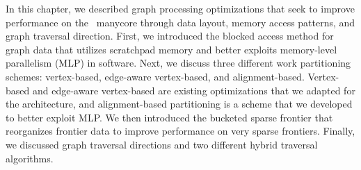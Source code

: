In this chapter, we described graph processing optimizations that seek to improve performance on the \hb~manycore through data layout, memory access patterns, and graph traversal direction.
First, we introduced the blocked access method for graph data that utilizes scratchpad memory and better exploits memory-level parallelism (MLP) in software.
Next, we discuss three different work partitioning schemes: vertex-based, edge-aware vertex-based, and alignment-based.
Vertex-based and edge-aware vertex-based are existing optimizations that we adapted for the \hb architecture, and alignment-based partitioning is a scheme that we developed to better exploit MLP.
We then introduced the bucketed sparse frontier that reorganizes frontier data to improve performance on very sparse frontiers.
Finally, we discussed graph traversal directions and two different hybrid traversal algorithms.
